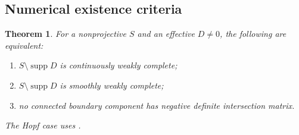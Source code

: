 \documentclass[11pt]{amsart}
\newtheorem{theorem}{Theorem}[section]
\theoremstyle{definition}
\theoremstyle{remark}
\numberwithin{equation}{section}
\newcommand{\supp}{\operatorname{supp}}
\begin{document}
\subsection{Numerical existence criteria}\label{sec:surface-nonprojective}
\begin{theorem}\label{thm:nonprojective}
For a nonprojective $S$ and an effective $D\ne0$, the following
are equivalent:
\begin{enumerate}[label=\textup{(\roman*)},leftmargin=2.5em]
\item $S\setminus\supp D$ is continuously weakly complete;
\item $S\setminus\supp D$ is smoothly weakly complete;
\item no connected boundary component has negative definite
intersection matrix.
\end{enumerate}
The Hopf case uses \cite[Theorem~1.6]{CFSTZ2026}.
\end{theorem}
\end{document}
